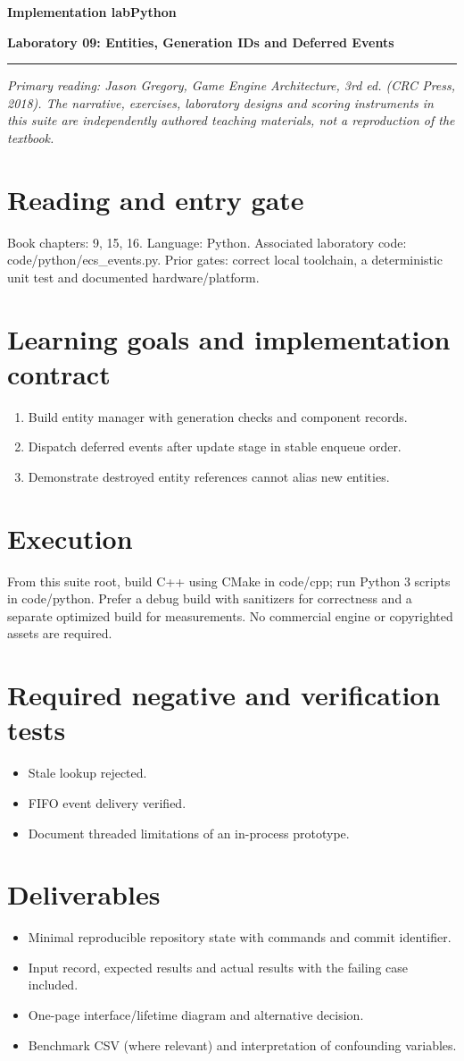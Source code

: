 \documentclass[11pt,letterpaper]{article}
\newcommand{\DocType}{Reference}
\newcommand{\SuiteHeading}[3]{%
\renewcommand{\DocType}{#2}%
{\small\bfseries\sffamily\color{EngineTeal}#2\hfill #3}\par\vspace{6pt}
{\LARGE\bfseries\color{EngineBlue}#1}\par\vspace{4pt}
{\color{EngineTeal}\rule{\linewidth}{1pt}}\par\vspace{7pt}}
\newcommand{\SourceNote}{\footnotesize\textit{Primary reading: Jason Gregory, \emph{Game Engine Architecture}, 3rd ed. (CRC Press, 2018). The narrative, exercises, laboratory designs and scoring instruments in this suite are independently authored teaching materials, not a reproduction of the textbook.}\normalsize\par}
\begin{document}
\SuiteHeading{Laboratory 09: Entities, Generation IDs and Deferred Events}{Implementation lab}{Python}
\SourceNote
\section{Reading and entry gate}
Book chapters: 9, 15, 16. Language: Python. Associated laboratory code: code/python/ecs\_events.py. Prior gates: correct local toolchain, a deterministic unit test and documented hardware/platform.

\section{Learning goals and implementation contract}
\begin{enumerate}
\item Build entity manager with generation checks and component records.
\item Dispatch deferred events after update stage in stable enqueue order.
\item Demonstrate destroyed entity references cannot alias new entities.
\end{enumerate}
\section{Execution}
From this suite root, build C++ using CMake in code/cpp; run Python 3 scripts in code/python. Prefer a debug build with sanitizers for correctness and a separate optimized build for measurements. No commercial engine or copyrighted assets are required.

\section{Required negative and verification tests}
\begin{itemize}
\item Stale lookup rejected.
\item FIFO event delivery verified.
\item Document threaded limitations of an in-process prototype.
\end{itemize}
\section{Deliverables}
\begin{itemize}
\item Minimal reproducible repository state with commands and commit identifier.
\item Input record, expected results and actual results with the failing case included.
\item One-page interface/lifetime diagram and alternative decision.
\item Benchmark CSV (where relevant) and interpretation of confounding variables.
\end{itemize}
\end{document}
